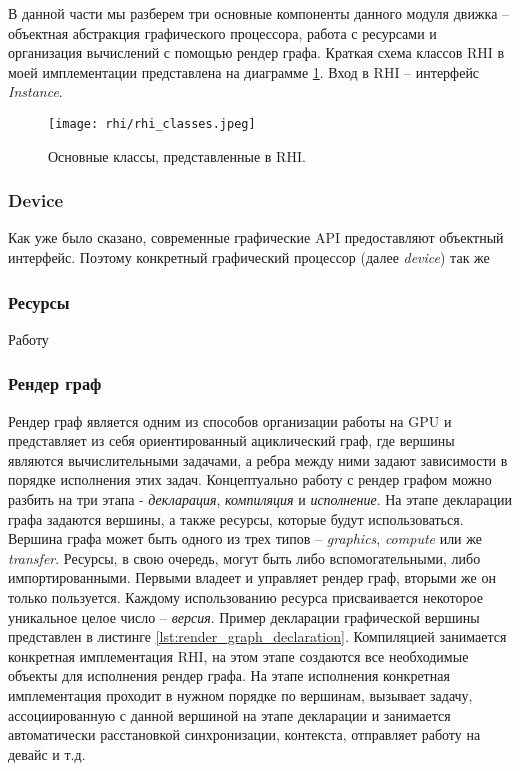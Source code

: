 В данной части мы разберем три основные компоненты данного модуля движка -- объектная абстракция графического процессора, работа с ресурсами и организация вычислений с помощью рендер графа. Краткая схема классов RHI в моей имплементации представлена на диаграмме \ref{fig:rhi_classes}. Вход в RHI -- интерфейс \textit{Instance}.

\begin{figure}[h]
    \centering
    \texttt{[image: rhi/rhi\_classes.jpeg]}
    \caption{Основные классы, представленные в RHI.}
    \label{fig:rhi_classes}
\end{figure}

\subsubsection{Device}
Как уже было сказано, современные графические API предоставляют объектный интерфейс. Поэтому конкретный графический процессор (далее \textit{device}) так же

\subsubsection{Ресурсы}
Работу 

\subsubsection{Рендер граф}
Рендер граф является одним из способов организации работы на GPU и представляет из себя ориентированный ациклический граф, где вершины являются вычислительными задачами, а ребра между ними задают зависимости в порядке исполнения этих задач. Концептуально работу с рендер графом можно разбить на три этапа - \textit{декларация}, \textit{компиляция} и \textit{исполнение}. На этапе декларации графа задаются вершины, а также ресурсы, которые будут использоваться. Вершина графа может быть одного из трех типов -- \textit{graphics}, \textit{compute} или же \textit{transfer}. Ресурсы, в свою очередь, могут быть либо вспомогательными, либо импортированными. Первыми владеет и управляет рендер граф, вторыми же он только пользуется. Каждому использованию ресурса присваивается некоторое уникальное целое число -- \textit{версия}. Пример декларации графической вершины представлен в листинге \ref{lst:render_graph_declaration}. Компиляцией занимается конкретная имплементация RHI, на этом этапе создаются все необходимые объекты для исполнения рендер графа. На этапе исполнения конкретная имплементация проходит в нужном порядке по вершинам, вызывает задачу, ассоциированную с данной вершиной на этапе декларации и занимается автоматически расстановкой синхронизации, контекста, отправляет работу на девайс и т.д.


